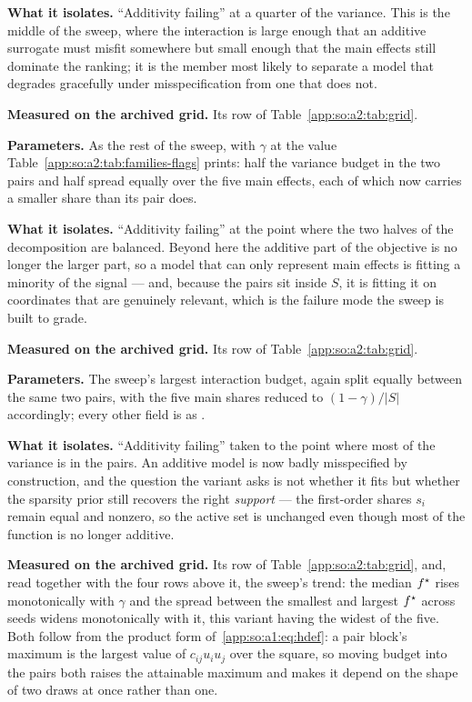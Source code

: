 \textbf{What it isolates.} ``Additivity failing'' at a quarter of the variance.
This is the middle of the sweep, where the interaction is large enough that an
additive surrogate must misfit somewhere but small enough that the main effects
still dominate the ranking; it is the member most likely to separate a model
that degrades gracefully under misspecification from one that does not.

\textbf{Measured on the archived grid.} Its row of
Table~\ref{app:so:a2:tab:grid}.

\label{app:so:a2:interaction-g0-50}

\textbf{Parameters.} As the rest of the sweep, with $\gamma$ at the value
Table~\ref{app:so:a2:tab:families-flags} prints: half the variance budget in the two
pairs and half spread equally over the five main effects, each of which now
carries a smaller share than its pair does.

\textbf{What it isolates.} ``Additivity failing'' at the point where the two
halves of the decomposition are balanced. Beyond here the additive part of the
objective is no longer the larger part, so a model that can only represent main
effects is fitting a minority of the signal --- and, because the pairs sit
inside $S$, it is fitting it on coordinates that are genuinely relevant, which
is the failure mode the sweep is built to grade.

\textbf{Measured on the archived grid.} Its row of
Table~\ref{app:so:a2:tab:grid}.

\label{app:so:a2:interaction-g0-75}

\textbf{Parameters.} The sweep's largest interaction budget, again split
equally between the same two pairs, with the five main shares reduced to
$(1-\gamma)/|S|$ accordingly; every other field is as
.

\textbf{What it isolates.} ``Additivity failing'' taken to the point where most
of the variance is in the pairs. An additive model is now badly misspecified by
construction, and the question the variant asks is not whether it fits but
whether the sparsity prior still recovers the right \emph{support} --- the
first-order shares $s_i$ remain equal and nonzero, so the active set is
unchanged even though most of the function is no longer additive.

\textbf{Measured on the archived grid.} Its row of
Table~\ref{app:so:a2:tab:grid}, and, read together with the four rows above it,
the sweep's trend: the median $f^\star$ rises monotonically with $\gamma$ and
the spread between the smallest and largest $f^\star$ across seeds widens
monotonically with it, this variant having the widest of the five. Both follow
from the product form of~\eqref{app:so:a1:eq:hdef}: a pair block's maximum is
the largest value of $c_{ij}u_i u_j$ over the square, so moving budget into the
pairs both raises the attainable maximum and makes it depend on the shape of
two draws at once rather than one.

